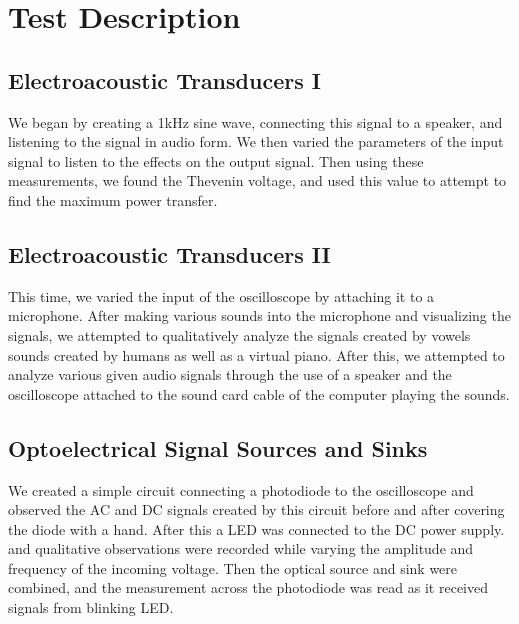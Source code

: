 \documentclass[10pt]{article}
\begin{document}
\medskip


\section{Test Description}

\subsection{Electroacoustic Transducers I}
We began by creating a 1kHz sine wave, connecting this signal to a speaker, and listening to the signal in audio form. We then varied the parameters of the input signal to listen to the effects on the output signal. Then using these measurements, we found the Thevenin voltage, and used this value to attempt to find the maximum power transfer.

\subsection{Electroacoustic Transducers II}
This time, we varied the input of the oscilloscope by attaching it to a microphone. After making various sounds into the microphone and visualizing the signals, we attempted to qualitatively analyze the signals created by vowels sounds created by humans as well as a virtual piano. After this, we attempted to analyze various given audio signals through the use of a speaker and the oscilloscope attached to the sound card cable of the computer playing the sounds.

\subsection{Optoelectrical Signal Sources and Sinks}
We created a simple circuit connecting a photodiode to the oscilloscope and observed the AC and DC signals created by this circuit before and after covering the diode with a hand. After this a LED was connected to the DC power supply. and qualitative observations were recorded while varying the amplitude and frequency of the incoming voltage. Then the optical source and sink were combined, and the measurement across the photodiode was read as it received signals from blinking LED.

\medskip

\end{document}
